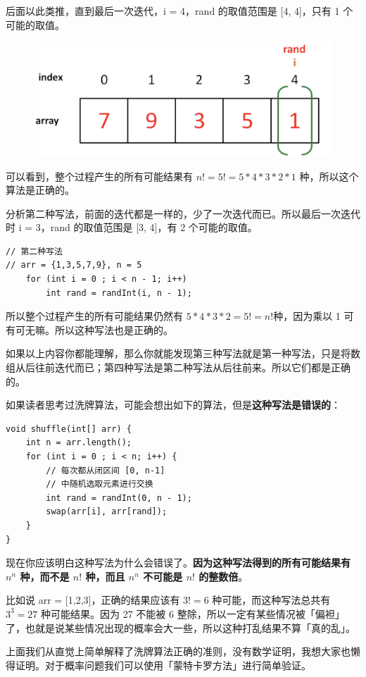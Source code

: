 \documentclass[12pt]{article}
\begin{document}
后面以此类推，直到最后一次迭代，i = 4，rand 的取值范围是 [4, 4]，只有 1 个可能的取值。
\begin{figure}[H]
    \centering
    \includegraphics[width=.6\textwidth]{fig/shuffle_algorithm_3.png}
\end{figure}

可以看到，整个过程产生的所有可能结果有 $n! = 5! = 5*4*3*2*1$ 种，所以这个算法是正确的。

分析第二种写法，前面的迭代都是一样的，少了一次迭代而已。所以最后一次迭代时 i = 3，rand 的取值范围是 [3, 4]，有 2 个可能的取值。
\begin{lstlisting}
// 第二种写法
// arr = {1,3,5,7,9}, n = 5
    for (int i = 0 ; i < n - 1; i++)
        int rand = randInt(i, n - 1);
\end{lstlisting}

所以整个过程产生的所有可能结果仍然有 $5*4*3*2 = 5! = n! $种，因为乘以 1 可有可无嘛。所以这种写法也是正确的。

如果以上内容你都能理解，那么你就能发现第三种写法就是第一种写法，只是将数组从后往前迭代而已；第四种写法是第二种写法从后往前来。所以它们都是正确的。

如果读者思考过洗牌算法，可能会想出如下的算法，但是\textbf{这种写法是错误的}：
\begin{lstlisting}
void shuffle(int[] arr) {
    int n = arr.length();
    for (int i = 0 ; i < n; i++) {
        // 每次都从闭区间 [0, n-1]
        // 中随机选取元素进行交换
        int rand = randInt(0, n - 1);
        swap(arr[i], arr[rand]);
    }
}
\end{lstlisting}

现在你应该明白这种写法为什么会错误了。\textbf{因为这种写法得到的所有可能结果有 $n^n$ 种，而不是 $n!$ 种，而且 $n^n$ 不可能是 $n!$ 的整数倍}。

比如说 arr = [1,2,3]，正确的结果应该有 $3!= 6$ 种可能，而这种写法总共有 $3^3 = 27$ 种可能结果。因为 27 不能被 6 整除，所以一定有某些情况被「偏袒」了，也就是说某些情况出现的概率会大一些，所以这种打乱结果不算「真的乱」。

上面我们从直觉上简单解释了洗牌算法正确的准则，没有数学证明，我想大家也懒得证明。对于概率问题我们可以使用「蒙特卡罗方法」进行简单验证。
\end{document}
